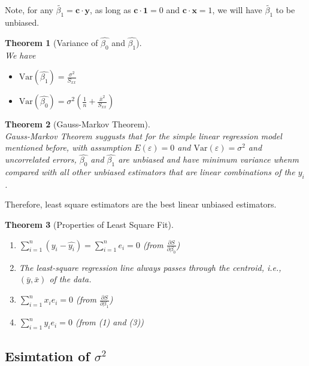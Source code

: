 \documentclass[12pt]{article}
\newcommand{\var}{\mathrm{Var}}
\newtheorem{theorem}{Theorem}[section]
\theoremstyle{definition}
\begin{document}
Note, for any $\tilde{\beta_1}= \mathbf{c}\cdot\mathbf{y}$, as long as $\mathbf{c}\cdot \mathbf{1} = 0$ and $\mathbf{c}\cdot \mathbf{x} = 1$, we will have $\tilde{\beta_1}$ to be unbiased.
\begin{theorem}[Variance of {$\hat{\beta_0}$} and {$\hat{\beta_1}$}]
\hfill\\\normalfont 
We have
\begin{itemize}
  \item $\var(\hat{\beta_1}) = \frac{\sigma^2}{S_{xx}}$
  \item $\var(\hat{\beta_0}) = \sigma^2\left(\frac{1}{n}+\frac{\bar{x}^2}{S_{xx}}\right)$
\end{itemize}
\end{theorem}
\begin{theorem}[Gauss-Markov Theorem]
\hfill\\\normalfont Gauss-Markov Theorem suggusts that for the simple linear regression model mentioned before, with assumption $E(\varepsilon) = 0$ and $\var(\varepsilon) = \sigma^2$ and uncorrelated errors, $\hat{\beta_0}$ and $\hat{\beta_1}$ are unbiased and have minimum variance whenm compared with all other unbiased estimators that are linear combinations of the $y_i$.
\end{theorem}
Therefore, least square estimators are the best linear unbiased estimators.
\begin{theorem}[Properties of Least Square Fit]
\hfill\\\normalfont \begin{enumerate}
\item $\sum_{i=1}^n (y_i-\hat{y_i}) =\sum_{i=1}^n e_i = 0$ (from $\frac{\partial S}{\partial \beta_0}$)
\item The least-square regression line always passes through the centroid, i.e., $(\bar{y}, \bar{x})$ of the data.
\item $\sum_{i=1}^n x_ie_i = 0$ (from $\frac{\partial S}{\partial \beta_1}$)
\item $\sum_{i=1}^n \hat{y_i}e_i = 0$ (from (1) and (3))
\end{enumerate}
\end{theorem}
\subsection{Esimtation of {$\sigma^2$}}
\end{document}
